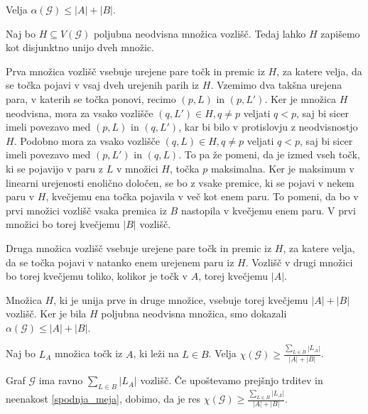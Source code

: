 \documentclass[mat1, tisk]{fmfdelo}
\begin{document}
    \begin{trditev}
        Velja $\alpha(\mathcal{G}) \leq |A| + |B|$.
    \end{trditev}

    \begin{dokaz}
        Naj bo $H \subseteq V(\mathcal{G})$ poljubna neodvisna množica vozlišč. Tedaj lahko $H$ zapišemo kot disjunktno unijo dveh množic.

        Prva množica vozlišč vsebuje urejene pare točk in premic iz $H$, za katere velja, da se točka pojavi v vsaj dveh urejenih parih iz $H$. Vzemimo dva takšna urejena para, v katerih se točka ponovi, recimo $(p, L)$ in $(p, L')$.
        Ker je množica $H$ neodvisna, mora za vsako vozlišče $(q, L') \in H, q \neq p$ veljati $q < p$, saj bi sicer imeli povezavo med $(p, L)$ in $(q, L')$, kar bi bilo v protislovju z neodvisnostjo $H$. Podobno mora 
        za vsako vozlišče $(q, L) \in H, q \neq p$ veljati $q < p$, saj bi sicer imeli povezavo med $(p, L')$ in $(q, L)$. To pa že pomeni, da je izmed vseh točk, ki se pojavijo v paru z $L$ v množici $H$, točka $p$ maksimalna.
        Ker je maksimum v linearni urejenosti enolično določen, se bo z vsake premice, ki se pojavi v nekem paru v $H$, kvečjemu ena točka pojavila v več kot enem paru. To pomeni, da bo v prvi množici vozlišč vsaka premica iz
        $B$ nastopila v kvečjemu enem paru. V prvi množici bo torej kvečjemu $|B|$ vozlišč.

        Druga množica vozlišč vsebuje urejene pare točk in premic iz $H$, za katere velja, da se točka pojavi v natanko enem urejenem paru iz $H$. Vozlišč v drugi množici bo torej kvečjemu toliko, kolikor je točk v $A$, torej kvečjemu $|A|$.
        
        Množica $H$, ki je unija prve in druge množice, vsebuje torej kvečjemu $|A| + |B|$ vozlišč. Ker je bila $H$ poljubna neodvisna množica, smo dokazali $\alpha(\mathcal{G}) \leq |A| + |B|$.
    \end{dokaz}

    \begin{trditev}
        Naj bo $L_A$ množica točk iz $A$, ki leži na $L \in B$. Velja $\chi(\mathcal{G}) \geq \frac{\sum_{L \in B}|L_A|}{|A| + |B|}$.
    \end{trditev}

    \begin{dokaz}
        Graf $\mathcal{G}$ ima ravno $\sum_{L \in B}|L_A|$ vozlišč. Če upoštevamo prejšnjo trditev in neenakost \ref{spodnja_meja}, dobimo, da je res $\chi(\mathcal{G}) \geq \frac{\sum_{L \in B}|L_A|}{|A| + |B|}$.
    \end{dokaz}
\end{document}
